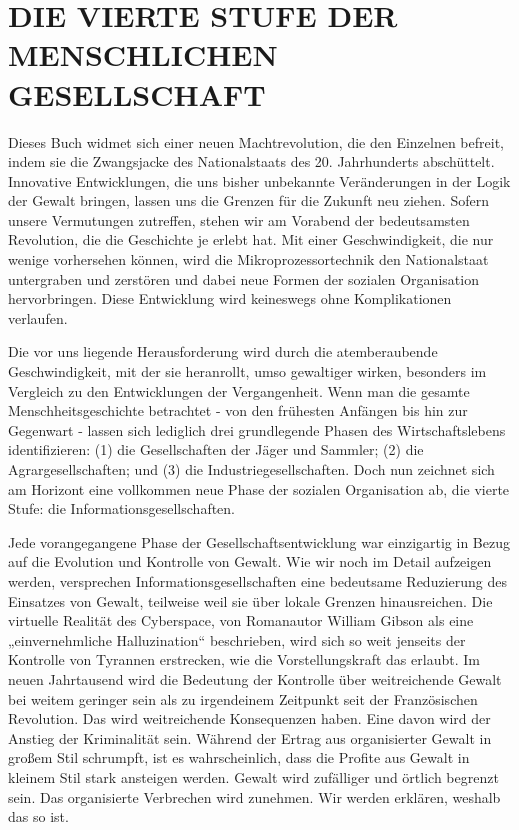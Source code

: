 \documentclass[
  a5paper,
  smalldemyvopaper,10pt,twoside,onecolumn,openright,extrafontsizes,hidelinks]{memoir}
\begin{document}
\section{DIE VIERTE STUFE DER MENSCHLICHEN
GESELLSCHAFT}\label{die-vierte-stufe-der-menschlichen-gesellschaft}

Dieses Buch widmet sich einer neuen Machtrevolution, die den Einzelnen
befreit, indem sie die Zwangsjacke des Nationalstaats des 20.
Jahrhunderts abschüttelt. Innovative Entwicklungen, die uns bisher
unbekannte Veränderungen in der Logik der Gewalt bringen, lassen uns die
Grenzen für die Zukunft neu ziehen. Sofern unsere Vermutungen zutreffen,
stehen wir am Vorabend der bedeutsamsten Revolution, die die Geschichte
je erlebt hat. Mit einer Geschwindigkeit, die nur wenige vorhersehen
können, wird die Mikroprozessortechnik den Nationalstaat untergraben und
zerstören und dabei neue Formen der sozialen Organisation hervorbringen.
Diese Entwicklung wird keineswegs ohne Komplikationen verlaufen.

Die vor uns liegende Herausforderung wird durch die atemberaubende
Geschwindigkeit, mit der sie heranrollt, umso gewaltiger wirken,
besonders im Vergleich zu den Entwicklungen der Vergangenheit. Wenn man
die gesamte Menschheitsgeschichte betrachtet - von den frühesten
Anfängen bis hin zur Gegenwart - lassen sich lediglich drei grundlegende
Phasen des Wirtschaftslebens identifizieren: (1) die Gesellschaften der
Jäger und Sammler; (2) die Agrargesellschaften; und (3) die
Industriegesellschaften. Doch nun zeichnet sich am Horizont eine
vollkommen neue Phase der sozialen Organisation ab, die vierte Stufe:
die Informationsgesellschaften.

Jede vorangegangene Phase der Gesellschaftsentwicklung war einzigartig
in Bezug auf die Evolution und Kontrolle von Gewalt. Wie wir noch im
Detail aufzeigen werden, versprechen Informationsgesellschaften eine
bedeutsame Reduzierung des Einsatzes von Gewalt, teilweise weil sie über
lokale Grenzen hinausreichen. Die virtuelle Realität des Cyberspace, von
Romanautor William Gibson als eine „einvernehmliche Halluzination``
beschrieben, wird sich so weit jenseits der Kontrolle von Tyrannen
erstrecken, wie die Vorstellungskraft das erlaubt. Im neuen Jahrtausend
wird die Bedeutung der Kontrolle über weitreichende Gewalt bei weitem
geringer sein als zu irgendeinem Zeitpunkt seit der Französischen
Revolution. Das wird weitreichende Konsequenzen haben. Eine davon wird
der Anstieg der Kriminalität sein. Während der Ertrag aus organisierter
Gewalt in großem Stil schrumpft, ist es wahrscheinlich, dass die Profite
aus Gewalt in kleinem Stil stark ansteigen werden. Gewalt wird
zufälliger und örtlich begrenzt sein. Das organisierte Verbrechen wird
zunehmen. Wir werden erklären, weshalb das so ist.
\end{document}
